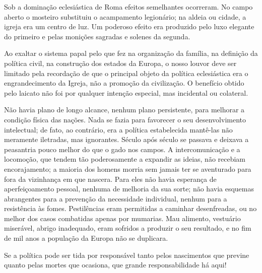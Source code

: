\documentclass[11pt,a5paper,twoside,openany]{book}
\begin{document}
Sob a dominação eclesiástica de Roma efeitos semelhantes ocorreram. No campo aberto o mosteiro substituiu o acampamento legionário; na aldeia ou cidade, a igreja era um centro de luz. Um poderoso efeito era produzido pelo luxo elegante do primeiro e pelas monições sagradas e solenes da segunda.

Ao exaltar o sistema papal pelo que fez na organização da família, na definição da política civil, na construção dos estados da Europa, o nosso louvor deve ser limitado pela recordação de que o principal objeto da política eclesiástica era o engrandecimento da Igreja, não a promoção da civilização. O benefício obtido pelo laicato não foi por qualquer intenção especial, mas incidental ou colateral.

Não havia plano de longo alcance, nenhum plano persistente, para melhorar a condição física das nações. Nada se fazia para favorecer o seu desenvolvimento intelectual; de fato, ao contrário, era a política estabelecida mantê-las não meramente iletradas, mas ignorantes. Século após século se passava e deixava a peasantria pouco melhor do que o gado nos campos. A intercomunicação e a locomoção, que tendem tão poderosamente a expandir as ideias, não recebiam encorajamento; a maioria dos homens morria sem jamais ter se aventurado para fora da vizinhança em que nascera. Para eles não havia esperança de aperfeiçoamento pessoal, nenhuma de melhoria da sua sorte; não havia esquemas abrangentes para a prevenção da necessidade individual, nenhum para a resistência às fomes. Pestilências eram permitidas a caminhar desenfreadas, ou no melhor dos casos combatidas apenas por mumarias. Mau alimento, vestuário miserável, abrigo inadequado, eram sofridos a produzir o seu resultado, e no fim de mil anos a população da Europa não se duplicara.

Se a política pode ser tida por responsável tanto pelos nascimentos que previne quanto pelas mortes que ocasiona, que grande responsabilidade há aqui!
\end{document}

